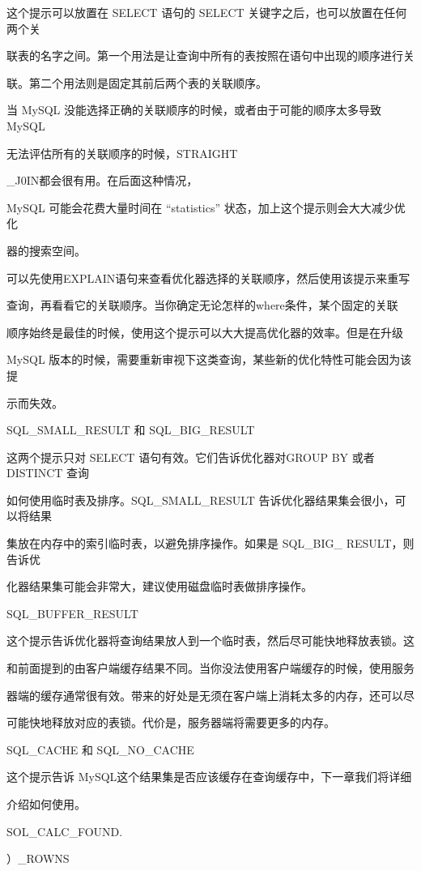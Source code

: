 这个提示可以放置在 SELECT 语句的 SELECT 关键字之后，也可以放置在任何两个关

联表的名字之间。第一个用法是让查询中所有的表按照在语句中出现的顺序进行关

联。第二个用法则是固定其前后两个表的关联顺序。

当 MySQL 没能选择正确的关联顺序的时候，或者由于可能的顺序太多导致MySQL

无法评估所有的关联顺序的时候，STRAIGHT

\_J0IN都会很有用。在后面这种情况，

MySQL 可能会花费大量时间在 “statistics” 状态，加上这个提示则会大大减少优化

器的搜索空间。

可以先使用EXPLAIN语句来查看优化器选择的关联顺序，然后使用该提示来重写

查询，再看看它的关联顺序。当你确定无论怎样的where条件，某个固定的关联

顺序始终是最佳的时候，使用这个提示可以大大提高优化器的效率。但是在升级

MySQL 版本的时候，需要重新审视下这类查询，某些新的优化特性可能会因为该提

示而失效。

SQL\_SMALL\_RESULT 和 SQL\_BIG\_RESULT

这两个提示只对 SELECT 语句有效。它们告诉优化器对GROUP BY 或者 DISTINCT 查询

如何使用临时表及排序。SQL\_SMALL\_RESULT 告诉优化器结果集会很小，可以将结果

集放在内存中的索引临时表，以避免排序操作。如果是 SQL\_BIG\_ RESULT，则告诉优

化器结果集可能会非常大，建议使用磁盘临时表做排序操作。

SQL\_BUFFER\_RESULT

这个提示告诉优化器将查询结果放人到一个临时表，然后尽可能快地释放表锁。这

和前面提到的由客户端缓存结果不同。当你没法使用客户端缓存的时候，使用服务

器端的缓存通常很有效。带来的好处是无须在客户端上消耗太多的内存，还可以尽

可能快地释放对应的表锁。代价是，服务器端将需要更多的内存。

SQL\_CACHE 和 SQL\_NO\_CACHE

这个提示告诉 MySQL这个结果集是否应该缓存在查询缓存中，下一章我们将详细

介绍如何使用。

SOL\_CALC\_FOUND.

）\_ROWNS

